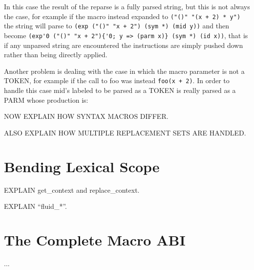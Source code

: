 \documentclass[12pt,english,letterpaper]{article}
\begin{document}
In this case the result of the reparse is a fully parsed string, but
this is not always the case, for example if the macro instead expanded
to \verb/("()" "(x + 2) * y")/ the string will parse to
\verb/(exp ("()" "x + 2") (sym *) (mid y))/ and then become
\verb/(exp'0 ("()" "x + 2"){'0; y => (parm x)} (sym *) (id x))/, that
is if any unparsed string are encountered the instructions are simply
pushed down rather than being directly applied.

Another problem is dealing with the case in which the macro parameter
is not a TOKEN, for example if the call to foo was instead
\verb/foo(x + 2)/.  In order to handle this case mid's labeled to be
parsed as a TOKEN is really parsed as a PARM whose production is:

\begin{code}
\end{code}

NOW EXPLAIN HOW SYNTAX MACROS DIFFER.

ALSO EXPLAIN HOW MULTIPLE REPLACEMENT SETS ARE HANDLED.

\section{Bending Lexical Scope}

EXPLAIN get\_context and replace\_context.

EXPLAIN ``fluid\_*''.

\section{The Complete Macro ABI}

...
\end{document}
